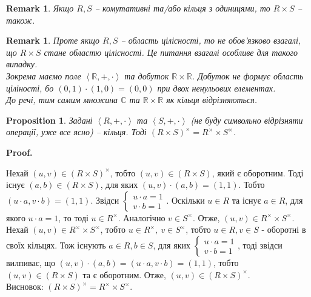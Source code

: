 \documentclass[a4paper, 10pt]{article}
\makeatletter
\theoremstyle{theoremdd}
\theoremstyle{theoremdd}
\theoremstyle{theoremdd}
\theoremstyle{theoremdd}
\theoremstyle{theoremdd}
\theoremstyle{theoremdd}
\theoremstyle{theoremdd}
\theoremstyle{theoremdd}
\theoremstyle{theoremdd}
\newtheorem{proposition}[theorem]{Proposition}
\theoremstyle{theoremdd}
\theoremstyle{theoremdd}
\newtheorem{remark}[theorem]{Remark}
\theoremstyle{theoremdd}
\theoremstyle{theoremdd}
\theoremstyle{theoremdd}
\theoremstyle{theoremdd}
\renewenvironment{proof}[1][Proof.\\]{\par
\pushQED{\hfill \qed}%
\normalfont \topsep6\p@\@plus6\p@\relax
\trivlist
\item\relax
{\bfseries
#1\@addpunct{.}}\hspace\labelsep\ignorespaces
}{%
\popQED\endtrivlist\@endpefalse
}
\makeatother
\begin{document}
\begin{remark}
Якщо $R,S$ -- комутативні та/або кільця з одиницями, то $R \times S$ -- також.
\end{remark}

\begin{remark}
Проте якщо $R,S$ -- область цілісності, то не обов'язково взагалі, що $R \times S$ стане областю цілісності. Це питання взагалі особливе для такого випадку.\\
Зокрема маємо поле $\left<\mathbb{R},+,\cdot\right>$ та добуток $\mathbb{R} \times \mathbb{R}$. Добуток не формує область ціліності, бо $(0,1) \cdot (1,0) = (0,0)$ при двох ненульових елементах.\\
До речі, тим самим множина $\mathbb{C}$ та $\mathbb{R} \times \mathbb{R}$ як кільця відрізняються.
\end{remark}

\begin{proposition}
Задані $\left< R,+,\cdot \right>$ та $\left< S,+,\cdot \right>$ (не буду символьно відрізняти операції, уже все ясно) -- кільця. Тоді $(R \times S)^\times = R^{\times} \times S^{\times}$.
\end{proposition}

\begin{proof}
Нехай $(u,v) \in (R \times S)^\times$, тобто $(u,v) \in (R \times S)$, який є оборотним. Тоді існує $(a,b) \in (R \times S)$, для яких $(u,v) \cdot (a,b) = (1,1)$. Тобто $(u \cdot a, v \cdot b) = (1,1)$. Звідси $\begin{cases} u \cdot a = 1 \\ v \cdot b = 1 \end{cases}$. Оскільки $u \in R$ та існує $a \in R$, для якого $u \cdot a = 1$, то тоді $u \in R^\times$. Аналогічно $v \in S^\times$. Отже, $(u,v) \in R^\times \times S^\times$.\\
Нехай $(u,v) \in R^\times \times S^{\times}$, тобто $u \in R^\times,\ v \in S^\times$, тобто $u \in R, v \in S$ - оборотні в своїх кільцях. Тож існують $a \in R,b \in S$, для яких $\begin{cases} u \cdot a = 1 \\ v \cdot b = 1 \end{cases}$, тоді звідси вилпиває, що $(u,v) \cdot (a,b) = (u \cdot a, v \cdot b) = (1,1)$, тобто $(u,v) \in (R \times S)$ та є оборотним. Отже, $(u,v) \in (R \times S)^\times$.\\
Висновок: $(R \times S)^\times = R^\times \times S^\times$.
\end{proof}
\end{document}
